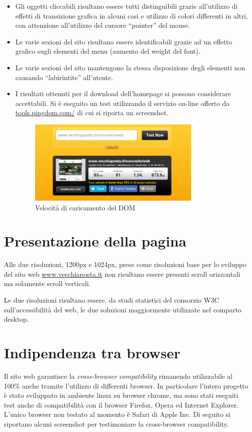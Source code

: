 \documentclass[a4paper,12pt,hidelinks]{report}
\begin{document}
\begin{itemize}
 \item Gli oggetti cliccabili risultano essere tutti distinguibili grazie all'utilizzo di effetti di transizione grafica in alcuni casi e utilizzo di colori differenti in altri,
 con attenzione all'utilizzo del cursore ``pointer'' del mouse.
 \item Le varie sezioni del sito risultano essere identificabili grazie ad un effetto grafico sugli elementi del menu (aumento del weight del font). 
 \item Le varie sezioni del sito mantengono la stessa disposizione degli elementi non causando ``labirintite'' all'utente.
 \item I risultati ottenuti per il download dell'homepage si possono considerare accettabili. Si è eseguito un test utilizzando il servizio on-line offerto da \url{tools.pingdom.com/}
 di cui si riporta un screenshot.
 \begin{figure}[h!]%
    \includegraphics[width=0.8\textwidth,keepaspectratio=true]{../img/verificaAccessibilita}
    \centering
    \caption{Velocità di caricamento del DOM}%
    \label{fig:velAccesso}%
\end{figure}

\end{itemize}
 
\newpage
\section*{Presentazione della pagina}
Alle due risoluzioni, 1200px e 1024px, prese come risoluzioni base per lo sviluppo del sito web \url{www.vecchiaposta.it} non risultano essere presenti 
scroll orizzontali ma solamente scroll verticali. 
\par Le due risoluzioni risultano essere, da studi statistici del consorzio W3C sull'accessibilità del web, le due soluzioni maggiormente utilizzate nel comparto desktop. 

\newpage
\section*{Indipendenza tra browser}
Il sito web garantisce la \textit{cross-browser compatibility} rimanendo utilizzabile al 100\% anche tramite l'utilizzo di differenti browser.
In particolare l'intero progetto è stato sviluppato in ambiente linux su browser chrome, ma sono stati eseguiti test anche di compatibilità con
il browser Firefox, Opera ed Internet Explorer. L'unico browser non testato al momento è Safari di Apple Inc.
Di seguito si riportano alcuni screenshot per testimoniare la cross-browser compatibility.
\end{document}
